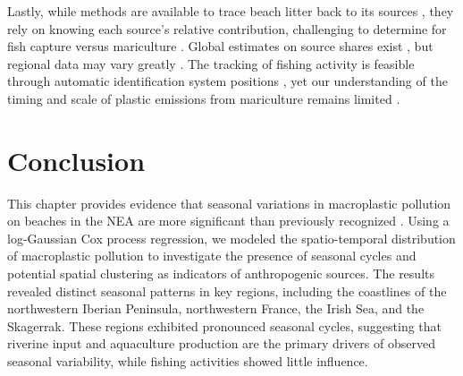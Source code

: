 Lastly, while methods are available to trace beach litter back to its sources \cite{van_duinen_identifying_2022, pierard_attribution_2022}, they rely on knowing each source's relative contribution, challenging to determine for fish capture versus mariculture \cite{skirtun_plastic_2022}. Global estimates on source shares exist  \cite{lebreton_evidence_2018,kaandorp_global_2023}, but regional data may vary greatly \cite{bringer_coastal_2021,morales-caselles_inshoreoffshore_2021, strokal_river_2023}. The tracking of fishing activity is feasible through automatic identification system positions \cite{kroodsma_tracking_2018}, yet our understanding of the timing and scale of plastic emissions from mariculture remains limited \cite{paolo_satellite_2024,tian_can_2022}.


\section{Conclusion}\label{sec:plastics:conclusion}
This chapter provides evidence that seasonal variations in macroplastic pollution on beaches in the NEA are more significant than previously recognized \cite{schulz_multi-criteria_2013}. Using a log-Gaussian Cox process regression, we modeled the spatio-temporal distribution of macroplastic pollution to investigate the presence of seasonal cycles and potential spatial clustering as indicators of anthropogenic sources. The results revealed distinct seasonal patterns in key regions, including the coastlines of the northwestern Iberian Peninsula, northwestern France, the Irish Sea, and the Skagerrak. These regions exhibited pronounced seasonal cycles, suggesting that riverine input and aquaculture production are the primary drivers of observed seasonal variability, while fishing activities showed little influence.


